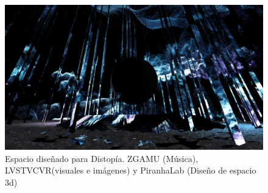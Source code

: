 \begin{figure} 
\includegraphics[width=\columnwidth]{../img/figura7.png} 
\caption[Distopía - Edges 2020]{Espacio diseñado para Distopía. ZGAMU (Música), LVSTVCVR(visuales e imágenes) y PiranhaLab (Diseño de espacio 3d)} %
\label{fig:gallery} 
\end{figure}
  




